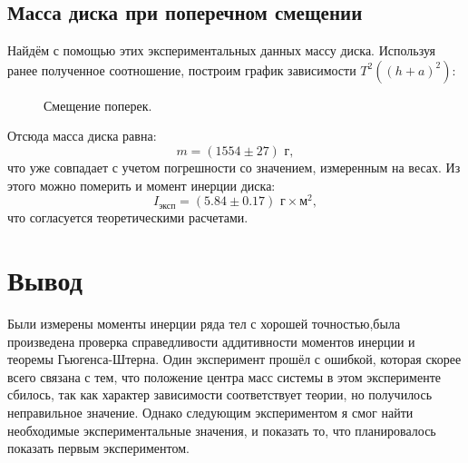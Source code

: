 \documentclass[a4paper, 12pt]{article}%
\begin{document}
\subsection{Масса диска при поперечном смещении}
Найдём с помощью этих экспериментальных данных массу диска. Используя ранее полученное соотношение, построим график зависимости $T^2((h+a)^2)$:

\begin{figure}[h!]
\caption{Смещение поперек.}
\end{figure}

Отсюда масса диска равна:
\[m=(1554\pm27)\text{ г},\]
что уже совпадает с учетом погрешности со значением, измеренным на весах. Из этого можно померить и момент инерции диска: 
\[I_{\text{эксп}}=(5.84\pm0.17) \text{  г}\times\text{м}^2,\]
что согласуется  теоретическими расчетами.
\section{Вывод}
Были измерены моменты инерции ряда тел с хорошей точностью,была произведена проверка справедливости аддитивности моментов инерции и теоремы Гьюгенса-Штерна. Один эксперимент прошёл с ошибкой, которая скорее всего связана с тем, что положение центра масс системы в этом эксперименте сбилось, так как характер зависимости соответствует теории, но получилось неправильное значение. Однако следующим экспериментом я смог найти необходимые экспериментальные значения, и показать то, что планировалось показать первым экспериментом.
\end{document}
